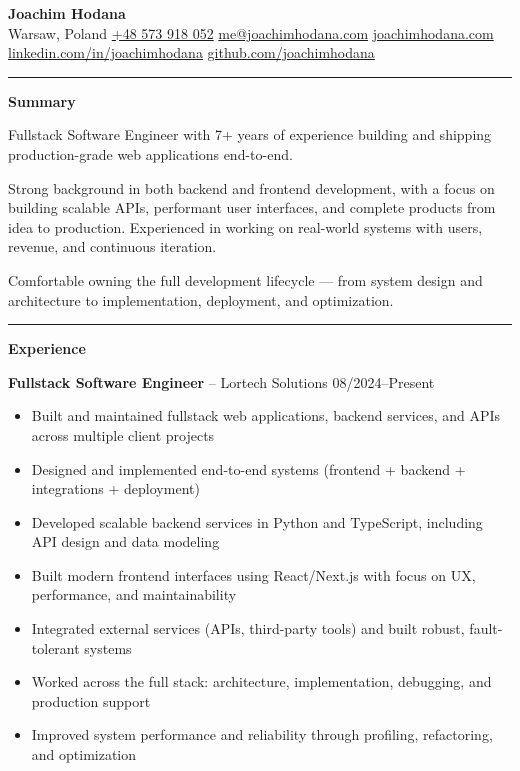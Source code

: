 \documentclass[11pt,a4paper]{article}
\begin{document}
{\LARGE \textbf{Joachim Hodana}} \\

Warsaw, Poland \quad
\href{tel:+48573918052}{+48 573 918 052} \quad
\href{mailto:me@joachimhodana.com}{me@joachimhodana.com} \quad
\href{https://joachimhodana.com}{joachimhodana.com} \\
\href{https://linkedin.com/in/joachimhodana}{linkedin.com/in/joachimhodana} \quad
\href{https://github.com/joachimhodana}{github.com/joachimhodana}

\rule{\textwidth}{0.5pt}

\textbf{Summary}

Fullstack Software Engineer with 7+ years of experience building and shipping production-grade web applications end-to-end.

Strong background in both backend and frontend development, with a focus on building scalable APIs, performant user interfaces, and complete products from idea to production. Experienced in working on real-world systems with users, revenue, and continuous iteration.

Comfortable owning the full development lifecycle — from system design and architecture to implementation, deployment, and optimization.

\rule{\textwidth}{0.5pt}

\textbf{Experience}

\textbf{Fullstack Software Engineer} -- Lortech Solutions \hfill 08/2024--Present
\begin{itemize}
\item Built and maintained fullstack web applications, backend services, and APIs across multiple client projects
\item Designed and implemented end-to-end systems (frontend + backend + integrations + deployment)
\item Developed scalable backend services in Python and TypeScript, including API design and data modeling
\item Built modern frontend interfaces using React/Next.js with focus on UX, performance, and maintainability
\item Integrated external services (APIs, third-party tools) and built robust, fault-tolerant systems
\item Worked across the full stack: architecture, implementation, debugging, and production support
\item Improved system performance and reliability through profiling, refactoring, and optimization
\end{itemize}
\end{document}
